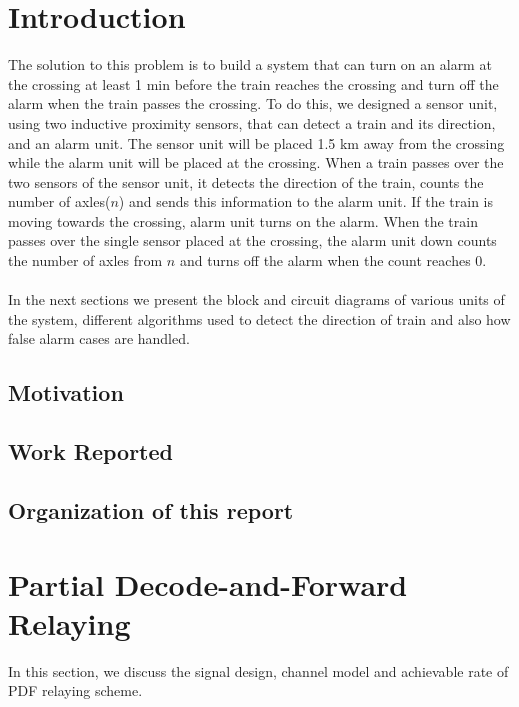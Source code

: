 \documentclass[titlepage]{article}
\begin{document}
\tableofcontents
\newpage





\section{Introduction}
The solution to this problem is to build a system that can turn on an alarm at the crossing at least 1 min
before the train reaches the crossing and turn off the alarm when the train passes the crossing. To do this, we
designed a sensor unit, using two inductive proximity sensors, that can detect a train and its direction,
and an alarm unit. The sensor unit will be placed 1.5 km away from the crossing while the alarm unit will be
placed at the crossing. When a train passes over the two sensors of the sensor unit, it detects the direction
of the train, counts the number of axles\footnotemark{}($n$) and sends this information to the alarm unit. If the train is moving
towards the crossing, alarm unit turns on the alarm. When the train passes over the single sensor placed at the crossing,
the alarm unit down counts the number of axles from $n$ and turns off the alarm when the count reaches 0.
\\ \\
In the next sections we present the block and circuit diagrams of various units of the system, different
algorithms used to detect the direction of train and also how false alarm cases are handled.
\subsection{Motivation}
\subsection{Work Reported}
\subsection{Organization of this report}

\section{Partial Decode-and-Forward Relaying}
In this section, we discuss the signal design, channel model and achievable rate of PDF relaying scheme.
\end{document}

